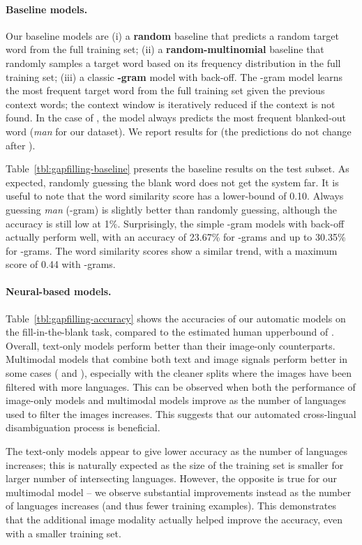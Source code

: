 \documentclass[twocolumn]{svjour3}          \smartqed  \usepackage{graphicx}
\begin{document}
\paragraph{Baseline models. } Our baseline models are (i) a \textbf{random} baseline that predicts a random target word from the full training set; (ii) a \textbf{random-multinomial} baseline that randomly samples a target word based on its frequency distribution in the full training set; (iii) a classic \textbf{-gram} model with back-off. The -gram model learns the most frequent target word from the full training set given the previous  context words; the context window is iteratively reduced if the context is not found. In the case of , the model always predicts the most frequent blanked-out word (\textit{man} for our dataset). We report results for  (the predictions do not change after ). 

Table~\ref{tbl:gapfilling-baseline} presents the baseline results on the test subset. As expected, randomly guessing the blank word does not get the system far. It is useful to note that the word similarity score has a lower-bound of 0.10. Always guessing \textit{man} (-gram) is slightly better than randomly guessing, although the accuracy is still low at 1\%. Surprisingly, the simple -gram models with back-off actually perform well, with an accuracy of 23.67\% for -grams and up to 30.35\% for -grams. The word similarity scores show a similar trend, with a maximum score of 0.44 with -grams.


\paragraph{Neural-based models. }
Table~\ref{tbl:gapfilling-accuracy} shows the accuracies of our automatic models on the fill-in-the-blank task, compared to the estimated human upperbound of . Overall, text-only models perform better than their image-only counterparts. Multimodal models that combine both text and image signals perform better in some cases ( and ), especially with the cleaner splits where the images have been filtered with more languages. This can be observed when both the performance of image-only models and multimodal models improve as the number of languages used to filter the images increases. This suggests that our automated cross-lingual disambiguation process is beneficial.

The text-only models appear to give lower accuracy as the number of languages increases; this is naturally expected as the size of the training set is smaller for larger number of intersecting languages. However, the opposite is true for our multimodal model -- we observe substantial improvements instead as the number of languages increases (and thus fewer training examples). This demonstrates that the additional image modality actually helped improve the accuracy, even with a smaller training set.
\end{document}
